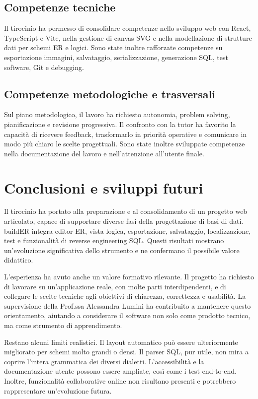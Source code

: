 \documentclass{unipd-thesis-modern}
\newcommand{\builder}{buildER}
\begin{document}
\section{Competenze tecniche}

Il tirocinio ha permesso di consolidare competenze nello sviluppo web con React, TypeScript e Vite, nella gestione di canvas SVG e nella modellazione di strutture dati per schemi ER e logici. Sono state inoltre rafforzate competenze su esportazione immagini, salvataggio, serializzazione, generazione SQL, test software, Git e debugging.

\section{Competenze metodologiche e trasversali}

Sul piano metodologico, il lavoro ha richiesto autonomia, problem solving, pianificazione e revisione progressiva. Il confronto con la tutor ha favorito la capacità di ricevere feedback, trasformarlo in priorità operative e comunicare in modo più chiaro le scelte progettuali. Sono state inoltre sviluppate competenze nella documentazione del lavoro e nell'attenzione all'utente finale.

\chapter{Conclusioni e sviluppi futuri}

Il tirocinio ha portato alla preparazione e al consolidamento di un progetto web articolato, capace di supportare diverse fasi della progettazione di basi di dati. \builder{} integra editor ER, vista logica, esportazione, salvataggio, localizzazione, test e funzionalità di reverse engineering SQL. Questi risultati mostrano un'evoluzione significativa dello strumento e ne confermano il possibile valore didattico.

L'esperienza ha avuto anche un valore formativo rilevante. Il progetto ha richiesto di lavorare su un'applicazione reale, con molte parti interdipendenti, e di collegare le scelte tecniche agli obiettivi di chiarezza, correttezza e usabilità. La supervisione della Prof.ssa Alessandra Lumini ha contribuito a mantenere questo orientamento, aiutando a considerare il software non solo come prodotto tecnico, ma come strumento di apprendimento.

Restano alcuni limiti realistici. Il layout automatico può essere ulteriormente migliorato per schemi molto grandi o densi. Il parser SQL, pur utile, non mira a coprire l'intera grammatica dei diversi dialetti. L'accessibilità e la documentazione utente possono essere ampliate, così come i test end-to-end. Inoltre, funzionalità collaborative online non risultano presenti e potrebbero rappresentare un'evoluzione futura.
\end{document}
